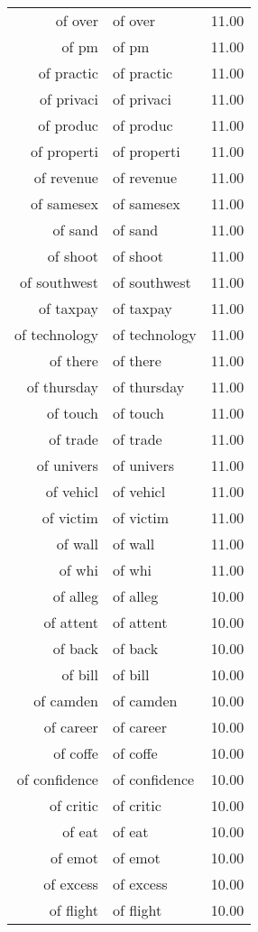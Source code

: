 \begin{table}[ht]
\begin{tabular}{rlr}
  of over & of over & 11.00 \\ 
  of pm & of pm & 11.00 \\ 
  of practic & of practic & 11.00 \\ 
  of privaci & of privaci & 11.00 \\ 
  of produc & of produc & 11.00 \\ 
  of properti & of properti & 11.00 \\ 
  of revenue & of revenue & 11.00 \\ 
  of samesex & of samesex & 11.00 \\ 
  of sand & of sand & 11.00 \\ 
  of shoot & of shoot & 11.00 \\ 
  of southwest & of southwest & 11.00 \\ 
  of taxpay & of taxpay & 11.00 \\ 
  of technology & of technology & 11.00 \\ 
  of there & of there & 11.00 \\ 
  of thursday & of thursday & 11.00 \\ 
  of touch & of touch & 11.00 \\ 
  of trade & of trade & 11.00 \\ 
  of univers & of univers & 11.00 \\ 
  of vehicl & of vehicl & 11.00 \\ 
  of victim & of victim & 11.00 \\ 
  of wall & of wall & 11.00 \\ 
  of whi & of whi & 11.00 \\ 
  of alleg & of alleg & 10.00 \\ 
  of attent & of attent & 10.00 \\ 
  of back & of back & 10.00 \\ 
  of bill & of bill & 10.00 \\ 
  of camden & of camden & 10.00 \\ 
  of career & of career & 10.00 \\ 
  of coffe & of coffe & 10.00 \\ 
  of confidence & of confidence & 10.00 \\ 
  of critic & of critic & 10.00 \\ 
  of eat & of eat & 10.00 \\ 
  of emot & of emot & 10.00 \\ 
  of excess & of excess & 10.00 \\ 
  of flight & of flight & 10.00 \\ 

\end{tabular}
\end{table}
